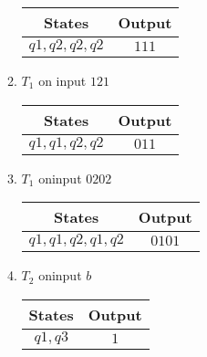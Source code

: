 \begin{enumerate}
\begin{enumerate}
\begin{table}[H]
                        \begin{tabular}{|c|c|}
                            \hline
                            States        & Output \\
                            \hline
                            $q1,q2,q2,q2$ & $111$  \\
                            \hline
                        \end{tabular}
                    \end{table}
              \item $T_1$ on input $121$
                    \begin{table}[H]
                        \centering
                        \begin{tabular}{|c|c|}
                            \hline
                            States        & Output \\
                            \hline
                            $q1,q1,q2,q2$ & $011$  \\
                            \hline
                        \end{tabular}
                    \end{table}
              \item $T_1$ oninput $0202$
                    \begin{table}[H]
                        \centering
                        \begin{tabular}{|c|c|}
                            \hline
                            States           & Output \\
                            \hline
                            $q1,q1,q2,q1,q2$ & $0101$ \\
                            \hline
                        \end{tabular}
                    \end{table}
              \item $T_2$ oninput $b$
                    \begin{table}[H]
                        \centering
                        \begin{tabular}{|c|c|}
                            \hline
                            States  & Output \\
                            \hline
                            $q1,q3$ & $1$    \\
                            \hline
                        \end{tabular}

\end{table}
\end{enumerate}
\end{enumerate}
